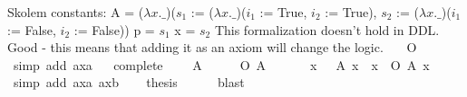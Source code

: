 \begin{isabellebody}
{  Skolem constants:
    A = ($\lambda x. \_$)($s_1$ := ($\lambda x. \_$)($i_1$ := True, $i_2$ := True), $s_2$ := ($\lambda x. \_$)($i_1$ := False, $i_2$ := False))
    p = $s_1$
    x = $s_2$
This formalization doesn't hold in DDL. Good - this means that adding it as an axiom will change the logic.%
}%
\endisatagproof
{\isafoldproof}%
%
\isadelimproof
%
\endisadelimproof
\isanewline
\isanewline
{}\isamarkupfalse%
\ {\isachardoublequoteopen}{\isasymTurnstile}\ {\isacharparenleft}\isactrlbold {\isasymnot}\ {\isacharparenleft}O\ {\isacharbraceleft}\isactrlbold {\isasymnot}\ \isactrlbold {\isasymtop}{\isacharbraceright}{\isacharparenright}{\isacharparenright}{\isachardoublequoteclose}\isanewline
%
\isadelimproof
\ \ %
\endisadelimproof
%
\isatagproof
{}\isamarkupfalse%
\ {\isacharparenleft}simp\ add{\isacharcolon}\ ax{\isacharunderscore}{}a{\isacharparenright}%
\endisatagproof
{\isafoldproof}%
%
\isadelimproof
\ \isanewline
%
\endisadelimproof
\isanewline
{}\isamarkupfalse%
\ complete{\isacharcolon}\isanewline
\ \ \ {\isachardoublequoteopen}{\isacharparenleft}{\isasymTurnstile}\ {\isacharparenleft}{\isacharparenleft}{\isacharparenleft}A\ \isactrlbold {\isasymrightarrow}\ \isactrlbold {\isasymnot}\isactrlbold {\isasymtop}{\isacharparenright}{\isacharparenright}{\isacharparenright}{\isacharparenright}\ {\isasymlongrightarrow}\ {\isacharparenleft}{\isasymTurnstile}\ {\isacharparenleft}\isactrlbold {\isasymnot}\ {\isacharparenleft}O\ {\isacharbraceleft}A{\isacharbraceright}{\isacharparenright}{\isacharparenright}{\isacharparenright}{\isachardoublequoteclose}\isanewline
%
\isadelimproof
%
\endisadelimproof
%
\isatagproof
{}\isamarkupfalse%
\ {\isacharminus}\ \isanewline
\ \ \isamarkupfalse%
\ {\isachardoublequoteopen}{\isacharparenleft}{\isasymexists}x{\isachardot}\ {\isacharparenleft}\isactrlbold {\isasymnot}\ {\isacharparenleft}{\isasymdiamond}\ A{\isacharparenright}{\isacharparenright}\ x{\isacharparenright}\ {\isasymlongrightarrow}\ {\isacharparenleft}{\isasymexists}x{\isachardot}\ {\isacharparenleft}\isactrlbold {\isasymnot}\ O\ {\isacharbraceleft}A{\isacharbraceright}{\isacharparenright}\ x{\isacharparenright}{\isachardoublequoteclose}\isanewline
\ \ \ \ \isamarkupfalse%
\ {\isacharparenleft}simp\ add{\isacharcolon}\ ax{\isacharunderscore}{}a\ ax{\isacharunderscore}{}b{\isacharparenright}\isanewline
\ \ \isamarkupfalse%
\ {\isacharquery}thesis\isanewline
\ \ \ \ \isamarkupfalse%
\ blast\isanewline

\end{isabellebody}
